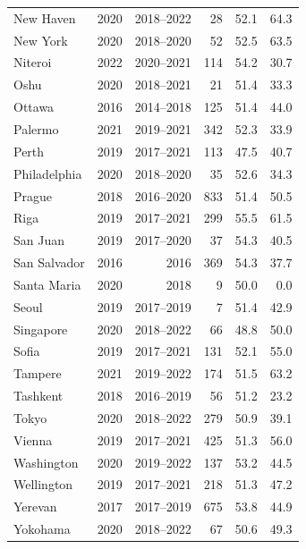 \begin{longtable}{@{}lrrrrr@{}}
New Haven & 2020 & 2018–2022 & 28 & 52.1 & 64.3 \\
New York & 2020 & 2018–2020 & 52 & 52.5 & 63.5 \\
Niteroi & 2022 & 2020–2021 & 114 & 54.2 & 30.7 \\
Oshu & 2020 & 2018–2021 & 21 & 51.4 & 33.3 \\
Ottawa & 2016 & 2014–2018 & 125 & 51.4 & 44.0 \\
Palermo & 2021 & 2019–2021 & 342 & 52.3 & 33.9 \\
Perth & 2019 & 2017–2021 & 113 & 47.5 & 40.7 \\
Philadelphia & 2020 & 2018–2020 & 35 & 52.6 & 34.3 \\
Prague & 2018 & 2016–2020 & 833 & 51.4 & 50.5 \\
Riga & 2019 & 2017–2021 & 299 & 55.5 & 61.5 \\
San Juan & 2019 & 2017–2020 & 37 & 54.3 & 40.5 \\
San Salvador & 2016 & 2016 & 369 & 54.3 & 37.7 \\
Santa Maria & 2020 & 2018 & 9 & 50.0 & 0.0 \\
Seoul & 2019 & 2017–2019 & 7 & 51.4 & 42.9 \\
Singapore & 2020 & 2018–2022 & 66 & 48.8 & 50.0 \\
Sofia & 2019 & 2017–2021 & 131 & 52.1 & 55.0 \\
Tampere & 2021 & 2019–2022 & 174 & 51.5 & 63.2 \\
Tashkent & 2018 & 2016–2019 & 56 & 51.2 & 23.2 \\
Tokyo & 2020 & 2018–2022 & 279 & 50.9 & 39.1 \\
Vienna & 2019 & 2017–2021 & 425 & 51.3 & 56.0 \\
Washington & 2020 & 2019–2022 & 137 & 53.2 & 44.5 \\
Wellington & 2019 & 2017–2021 & 218 & 51.3 & 47.2 \\
Yerevan & 2017 & 2017–2019 & 675 & 53.8 & 44.9 \\
Yokohama & 2020 & 2018–2022 & 67 & 50.6 & 49.3 \\
\end{longtable}
